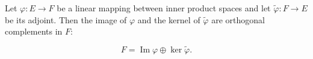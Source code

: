 Let $\varphi: E \rightarrow F$ be a linear mapping between inner product spaces and let $\tilde{\varphi}: F \rightarrow E$ be its adjoint. Then the image of $\varphi$ and the kernel of $\tilde{\varphi}$ are orthogonal complements in $F$:

$$F = \operatorname{Im} \varphi \oplus \ker \tilde{\varphi}.$$
